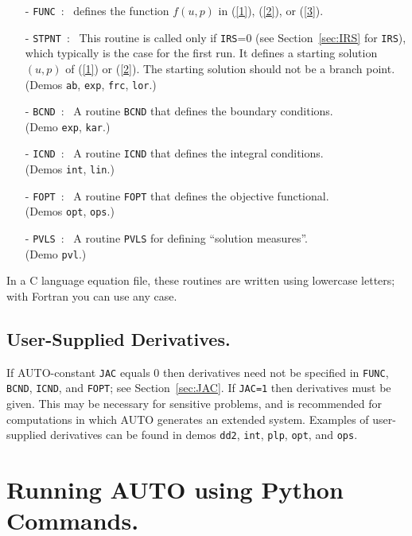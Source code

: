 \documentclass[12pt]{report}
\begin{document}
\begin{itemize}
\item[-] {\tt FUNC}~:~
  defines the function $f(u,p)$ in (\ref{1}), (\ref{2}), or (\ref{3}).
\item[-] {\tt STPNT}~:~
  This routine is called only if {\tt IRS}=0 
(see Section~\ref{sec:IRS} for {\tt IRS}),
  which typically is the case for the first run.
  It defines a starting solution $(u,p)$ of (\ref{1}) or (\ref{2}).
  The starting solution should not be a branch point.\\ 
  (Demos {\tt ab}, {\tt exp}, {\tt frc}, {\tt lor}.)  
\item[-] {\tt BCND}~:~ 
  A routine {\tt BCND} that defines the boundary conditions. \\
  (Demo {\tt exp}, {\tt kar}.)
\item[-] {\tt ICND}~:~ 
  A routine {\tt ICND} that defines the integral conditions. \\ 
  (Demos {\tt int}, {\tt lin}.)  
\item[-] {\tt FOPT}~:~ 
  A routine {\tt FOPT} that defines the objective functional. \\ 
  (Demos {\tt opt}, {\tt ops}.)  
\item[-] {\tt PVLS}~:~
  A routine {\tt PVLS} for defining ``solution measures''. \\
  (Demo {\tt pvl}.)
\end{itemize}

In a C language equation file, these routines are written using
lowercase letters; with Fortran you can use any case.
 
\section{ User-Supplied Derivatives.} \label{sec:derivatives}
If {\cal AUTO}-constant {\tt JAC} equals 0 
then derivatives need not be specified in 
{\tt FUNC}, {\tt BCND}, {\tt ICND}, and {\tt FOPT}; see Section~\ref{sec:JAC}.
If {\tt JAC=1} then derivatives must be given.
This may be necessary for sensitive 
problems, and is recommended for computations in which {\cal AUTO} 
generates an extended system.
Examples of user-supplied derivatives can be found in
demos  {\tt dd2}, {\tt int}, {\tt plp}, {\tt opt}, and {\tt ops}.

\chapter{ Running {\cal AUTO} using Python Commands.} \label{ch:python_mode}
\end{document}
